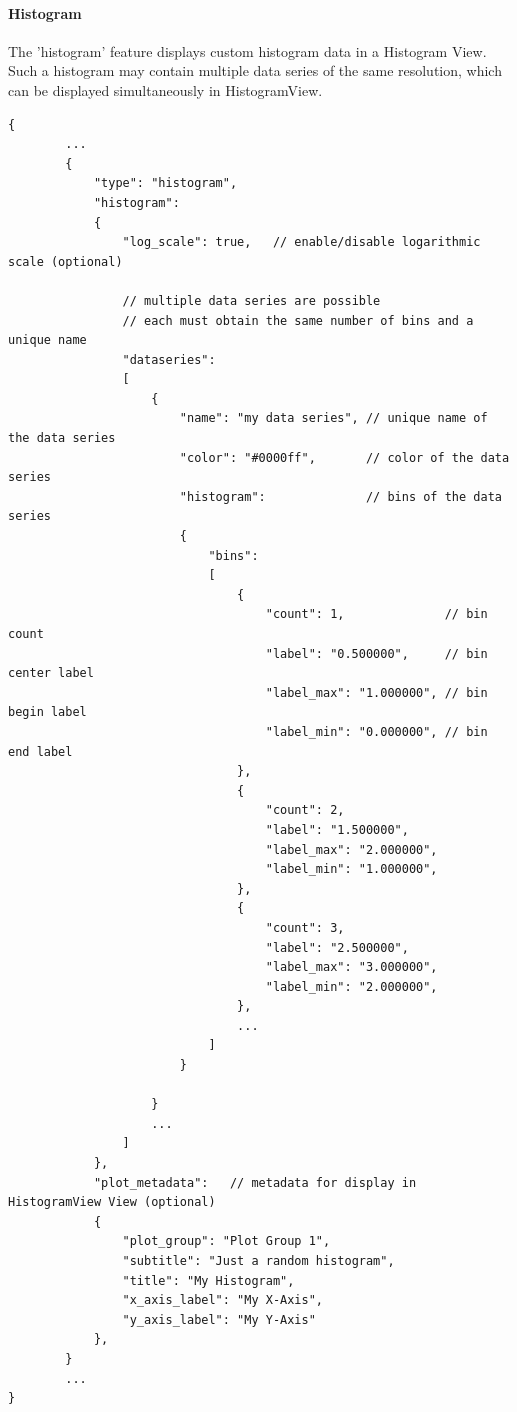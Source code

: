 \paragraph{Histogram} The 'histogram' feature displays custom histogram data in a Histogram View. 
Such a histogram may contain multiple data series of the same resolution, which can be
displayed simultaneously in HistogramView.

\begin{lstlisting}[basicstyle=\small\ttfamily]
{
        ...
        {
            "type": "histogram",
            "histogram": 
            {
                "log_scale": true,   // enable/disable logarithmic scale (optional)

                // multiple data series are possible 
                // each must obtain the same number of bins and a unique name
                "dataseries": 
                [
                    {
                        "name": "my data series", // unique name of the data series
                        "color": "#0000ff",       // color of the data series
                        "histogram":              // bins of the data series
                        {
                            "bins": 
                            [
                                {
                                    "count": 1,              // bin count
                                    "label": "0.500000",     // bin center label
                                    "label_max": "1.000000", // bin begin label
                                    "label_min": "0.000000", // bin end label
                                },
                                {
                                    "count": 2,
                                    "label": "1.500000",
                                    "label_max": "2.000000",
                                    "label_min": "1.000000",
                                },
                                {
                                    "count": 3,
                                    "label": "2.500000",
                                    "label_max": "3.000000",
                                    "label_min": "2.000000",
                                },
                                ...
                            ]
                        }
                        
                    }
                    ...
                ]
            },
            "plot_metadata":   // metadata for display in HistogramView View (optional)
            {
                "plot_group": "Plot Group 1",
                "subtitle": "Just a random histogram",
                "title": "My Histogram",
                "x_axis_label": "My X-Axis",
                "y_axis_label": "My Y-Axis"
            },
        }
        ...
}
\end{lstlisting}

